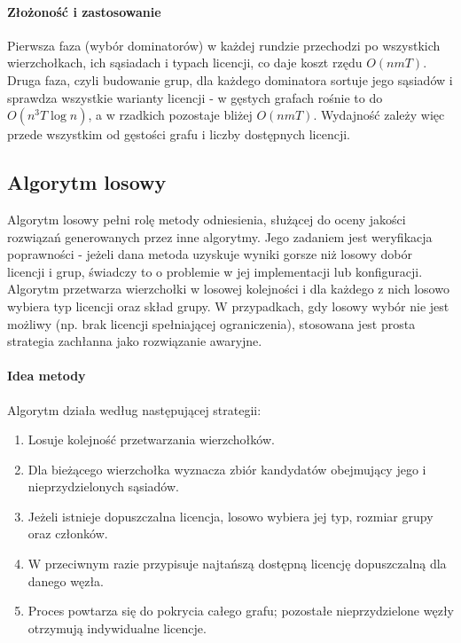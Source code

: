 \paragraph{Złożoność i zastosowanie}
Pierwsza faza (wybór dominatorów) w każdej rundzie przechodzi po wszystkich wierzchołkach, ich sąsiadach i typach licencji, co daje koszt rzędu $O(n m T)$. Druga faza, czyli budowanie grup, dla każdego dominatora sortuje jego sąsiadów i sprawdza wszystkie warianty licencji - w gęstych grafach rośnie to do $O(n^3 T \log n)$, a w rzadkich pozostaje bliżej $O(n m T)$. Wydajność zależy więc przede wszystkim od gęstości grafu i liczby dostępnych licencji.

\subsection{Algorytm losowy}\label{subsec:random}

Algorytm losowy pełni rolę metody odniesienia, służącej do oceny jakości rozwiązań generowanych przez inne algorytmy.
Jego zadaniem jest weryfikacja poprawności - jeżeli dana metoda uzyskuje wyniki gorsze niż losowy dobór licencji i grup, świadczy to o problemie w jej implementacji lub konfiguracji.
Algorytm przetwarza wierzchołki w losowej kolejności i dla każdego z nich losowo wybiera typ licencji oraz skład grupy.
W przypadkach, gdy losowy wybór nie jest możliwy (np. brak licencji spełniającej ograniczenia), stosowana jest prosta strategia zachłanna jako rozwiązanie awaryjne.

\paragraph{Idea metody}
Algorytm działa według następującej strategii:
\begin{enumerate}
  \item Losuje kolejność przetwarzania wierzchołków.
  \item Dla bieżącego wierzchołka wyznacza zbiór kandydatów obejmujący jego i nieprzydzielonych sąsiadów.
  \item Jeżeli istnieje dopuszczalna licencja, losowo wybiera jej typ, rozmiar grupy oraz członków.
  \item W przeciwnym razie przypisuje najtańszą dostępną licencję dopuszczalną dla danego węzła.
  \item Proces powtarza się do pokrycia całego grafu; pozostałe nieprzydzielone węzły otrzymują indywidualne licencje.
\end{enumerate}


